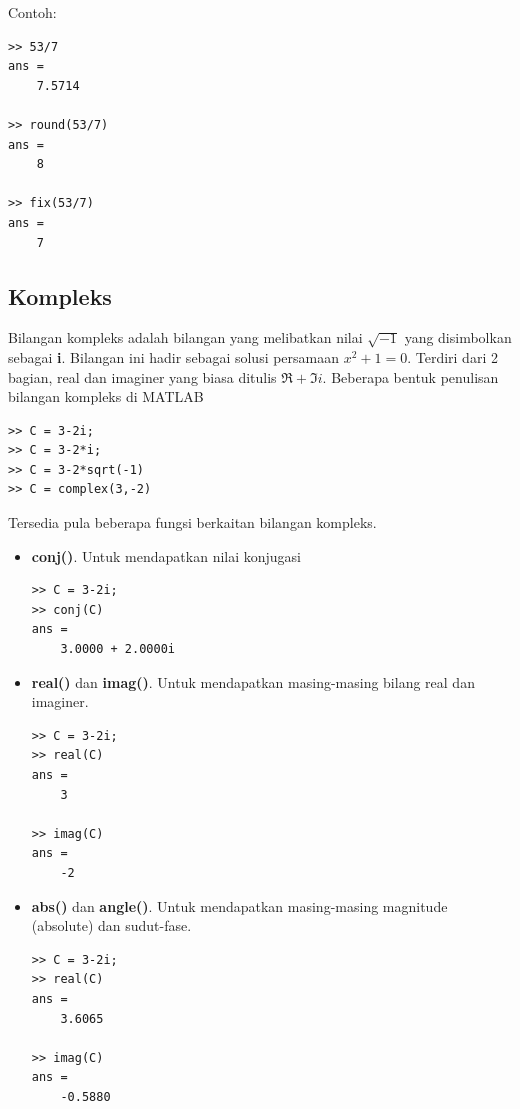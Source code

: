 \documentclass[12pt]{book}
\begin{document}
	Contoh:
	\begin{verbatim}
>> 53/7
ans =
    7.5714

>> round(53/7)
ans =
    8

>> fix(53/7)
ans =
    7
	\end{verbatim}

	\subsection{Kompleks}

	Bilangan kompleks adalah bilangan yang melibatkan nilai $\sqrt{-1}$ yang disimbolkan sebagai \textbf{i}.
	Bilangan ini hadir sebagai solusi persamaan $x^{2}+1=0$.
	Terdiri dari 2 bagian, real dan imaginer yang biasa ditulis $\Re+\Im i$.
	Beberapa bentuk penulisan bilangan kompleks di MATLAB
	\begin{verbatim}
>> C = 3-2i;
>> C = 3-2*i;
>> C = 3-2*sqrt(-1)
>> C = complex(3,-2)
	\end{verbatim}

	Tersedia pula beberapa fungsi berkaitan bilangan kompleks.
	\begin{itemize}
		\item \textbf{conj()}. Untuk mendapatkan nilai konjugasi
		\begin{verbatim}
>> C = 3-2i;
>> conj(C)
ans =
    3.0000 + 2.0000i
		\end{verbatim}

		\item \textbf{real()} dan \textbf{imag()}. Untuk mendapatkan masing-masing bilang real dan imaginer.
		\begin{verbatim}
>> C = 3-2i;
>> real(C)
ans =
    3

>> imag(C)
ans =
    -2
		\end{verbatim}

		\item \textbf{abs()} dan \textbf{angle()}. Untuk mendapatkan masing-masing magnitude (absolute) dan sudut-fase.
		\begin{verbatim}
>> C = 3-2i;
>> real(C)
ans =
    3.6065

>> imag(C)
ans =
    -0.5880
		\end{verbatim}
	\end{itemize}
\end{document}
